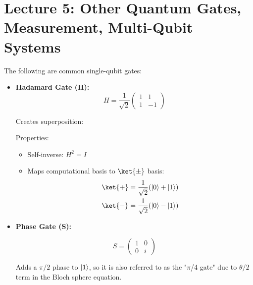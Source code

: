 \section{Lecture 5: Other Quantum Gates, Measurement, Multi-Qubit Systems}
\label{sec:lecture5}


The following are common single-qubit gates:

\begin{itemize}
  \item \textbf{Hadamard Gate (H):}
    \[
      \boxed{
        H = \frac{1}{\sqrt{2}} \begin{pmatrix} 1 & 1 \\ 1 & -1 \end{pmatrix}
      }
    \]

    Creates superposition: 

    \vspace{0.3cm}

    Properties:

    \begin{itemize}
      \item Self-inverse: $H^2 = I$
      \item Maps computational basis to $\ket{\pm}$ basis:
        \begin{align*}
          \ket{+} &= \frac{1}{\sqrt{2}}(\zero + \one) \\
          \ket{-} &= \frac{1}{\sqrt{2}}(\zero - \one)
        \end{align*}
    \end{itemize}

    \nt{
      \[
        H \zero = \ket{+}, \quad H \one = \ket{-}, \quad H \ket{+} = \zero,
        \quad H \ket{-} = \one
      \]
    }

  \item \textbf{Phase Gate (S):}

    \[
      \boxed{
        S = \begin{pmatrix} 1 & 0 \\ 0 & i \end{pmatrix}
      }
    \]

    Adds a $\pi/2$ phase to $\left|1\right\rangle$, so it is also referred to as the "$\pi$/4
    gate" due to $\theta/2$ term in the Bloch sphere equation.


\end{itemize}
